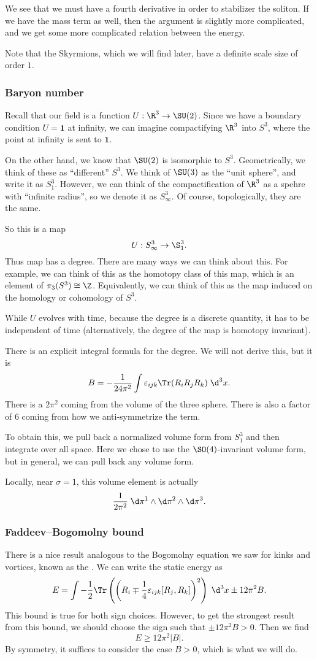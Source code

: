 \documentclass[a4paper]{article}
\begin{document}
We see that we must have a fourth derivative in order to stabilizer the soliton. If we have the mass term as well, then the argument is slightly more complicated, and we get some more complicated relation between the energy.

Note that the Skyrmions, which we will find later, have a definite scale size of order $1$.

\subsubsection*{Baryon number}
Recall that our field is a function $U: \R^3 \to \SU(2)$. Since we have a boundary condition $U = \mathbf{1}$ at infinity, we can imagine compactifying $\R^3$ into $S^3$, where the point at infinity is sent to $\mathbf{1}$.

On the other hand, we know that $\SU(2)$ is isomorphic to $S^3$. Geometrically, we think of these as ``different'' $S^3$. We think of $\SU(3)$ as the ``unit sphere'', and write it as $S^3_1$. However, we can think of the compactification of $\R^3$ as a spehre with ``infinite radius'', so we denote it as $S^3_\infty$. Of course, topologically, they are the same.

So this is a map
\[
  U: S^3_\infty \to \S^3_1.
\]
Thus map has a degree. There are many ways we can think about this. For example, we can think of this as the homotopy class of this map, which is an element of $\pi_3(S^3) \cong \Z$. Equivalently, we can think of this as the map induced on the homology or cohomology of $S^3$.

While $U$ evolves with time, because the degree is a discrete quantity, it has to be independent of time (alternatively, the degree of the map is homotopy invariant).

There is an explicit integral formula for the degree. We will not derive this, but it is
\[
  B = - \frac{1}{24\pi^2} \int \varepsilon_{ijk} \Tr(R_i R_j R_k) \;\d^3 x.
\]
There is a $2\pi^2$ coming from the volume of the three sphere. There is also a factor of $6$ coming from how we anti-symmetrize the term.

To obtain this, we pull back a normalized volume form from $S_1^3$ and then integrate over all space. Here we chose to use the $\SO(4)$-invariant volume form, but in general, we can pull back any volume form.

Locally, near $\sigma = 1$, this volume element is actually
\[
  \frac{1}{2\pi^2}\;\d \pi^1 \wedge\d \pi^2 \wedge\d \pi^3.
\]
\subsubsection*{Faddeev--Bogomolny bound}
There is a nice result analogous to the Bogomolny equation we saw for kinks and vortices, known as the . We can write the static energy as
\[
  E = \int - \frac{1}{2} \Tr\left(\left(R_i \mp \frac{1}{4} \varepsilon_{ijk}[R_j, R_k]\right)^2\right)\;\d^3 x \pm 12 \pi^2 B.
\]
This bound is true for both sign choices. However, to get the strongest result from this bound, we should choose the sign such that $\pm 12 \pi^2 B > 0$. Then we find
\[
  E \geq 12 \pi^2 |B|.  
\]
By symmetry, it suffices to consider the case $B > 0$, which is what we will do.
\end{document}
